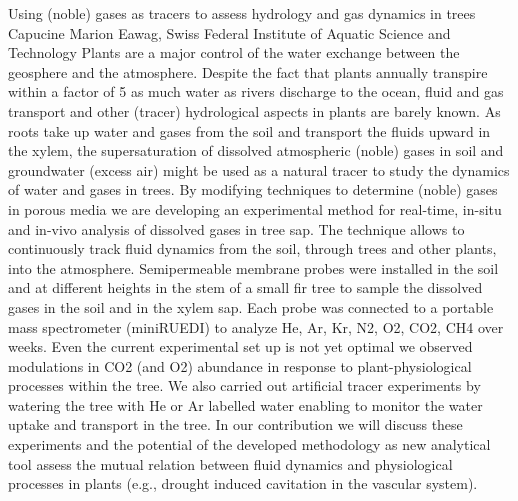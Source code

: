 \begin{conf-abstract}
{Using (noble) gases as tracers to assess hydrology and gas dynamics in trees}
{Capucine Marion}
{Eawag, Swiss Federal Institute of Aquatic Science and Technology}
{Plants are a major control of the water exchange between the geosphere and the atmosphere. Despite the fact that plants annually transpire within a factor of 5 as much water as rivers discharge to the ocean, fluid and gas transport and other (tracer) hydrological aspects in plants are barely known. As roots take up water and gases from the soil and transport the fluids upward in the xylem, the supersaturation of dissolved atmospheric (noble) gases in soil and groundwater (excess air) might be used as a natural tracer to study the dynamics of water and gases in trees. By modifying techniques to determine (noble) gases in porous media we are developing an experimental method for real-time, in-situ and in-vivo analysis of dissolved gases in tree sap. The technique allows to continuously track fluid dynamics from the soil, through trees and other plants, into the atmosphere.
Semipermeable membrane probes were installed in the soil and at different heights in the stem of a small fir tree to sample the dissolved gases in the soil and in the xylem sap. Each probe was connected to a portable mass spectrometer (miniRUEDI) to analyze He, Ar, Kr, N2, O2, CO2, CH4 over weeks. Even the current experimental set up is not yet optimal we observed modulations in CO2 (and O2) abundance in response to plant-physiological processes within the tree. We also carried out artificial tracer experiments by watering the tree with He or Ar labelled water enabling to monitor the water uptake and transport in the tree.
In our contribution we will discuss these experiments and the potential of the developed methodology as new analytical tool assess the mutual relation between fluid dynamics and physiological processes in plants (e.g., drought induced cavitation in the vascular system).}
\end{conf-abstract}
